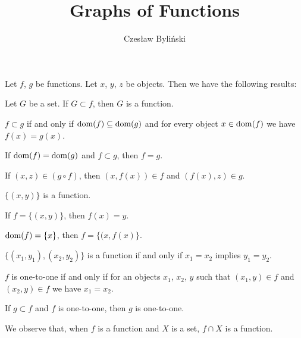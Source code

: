 \documentclass{article}
\title{Graphs of Functions}
\author{Czes{\l}aw Byli\'nski}
\begin{document}
\maketitle

Let $f$, $g$ be functions. Let $x$, $y$, $z$ be objects. Then we have
the following results:
\begin{thm}
\item\label{grfunc1:1} Let $G$ be a set. If $G\subset f$, then $G$ is a function.
\item\label{grfunc1:2} $f\subset g$ if and only if
  $\operatorname{dom}(f)\subseteq\operatorname{dom}(g)$ and for every object $x\in\operatorname{dom}(f)$ we have $f(x)=g(x)$.
\item\label{grfunc1:3} If $\operatorname{dom}(f)=\operatorname{dom}(g)$ and $f\subset g$, then $f=g$.
\item\label{grfunc1:4} If $(x,z)\in(g\circ f)$, then $(x,f(x))\in f$ and
  $(f(x),z)\in g$.
\item\label{grfunc1:5} $\{(x,y)\}$ is a function.
\item\label{grfunc1:6} If $f=\{(x,y)\}$, then $f(x)=y$.
\item\label{grfunc1:7} $\operatorname{dom}(f)=\{x\}$, then $f=\{(x,f(x)\}$.
\item\label{grfunc1:8} $\{(x_{1},y_{1}),(x_{2},y_{2})\}$ is a function
  if and only if $x_{1}=x_{2}$ implies $y_{1}=y_{2}$.
\item\label{grfunc1:9} $f$ is one-to-one if and only if for an objects
  $x_{1}$, $x_{2}$, $y$ such that $(x_{1},y)\in f$ and $(x_{2},y)\in f$
  we have $x_{1}=x_{2}$.
\item\label{grfunc1:10} If $g\subset f$ and $f$ is one-to-one, then $g$
  is one-to-one.
\end{thm}

We observe that, when $f$ is a function and $X$ is a set, $f\cap X$ is a function.
\end{document}
